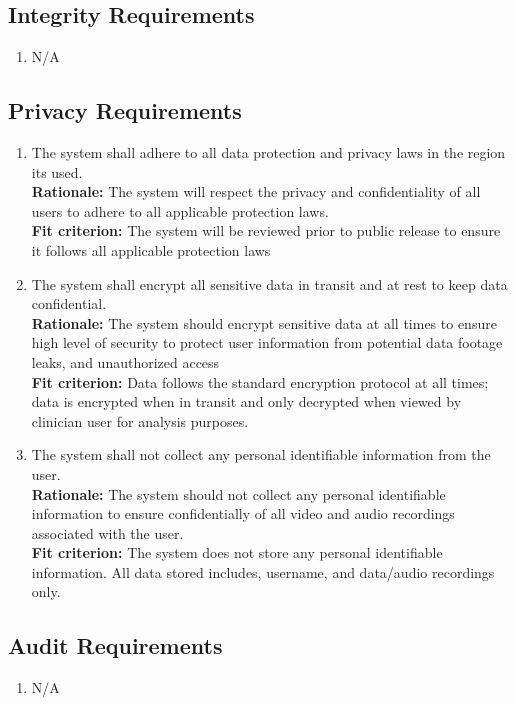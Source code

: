 \documentclass[12pt]{article}
\begin{document}
\subsection{Integrity Requirements}
\begin{enumerate}[{SR-INT}1. ]
  \item N/A
\end{enumerate}
\subsection{Privacy Requirements}
\begin{enumerate}[{SR-P}1. ]
  \item The system shall adhere to all data protection and privacy laws in the region its used.\\
  \textbf{Rationale: }The system will respect the privacy and confidentiality of all users to adhere to all applicable protection laws.\\
  \textbf{Fit criterion: }The system will be reviewed prior to public release to ensure it follows all applicable protection laws
  \item The system shall encrypt all sensitive data in transit and at rest to keep data confidential.\\
  \textbf{Rationale: }The system should encrypt sensitive data at all times to ensure high level of security to protect user information from potential data footage leaks, and unauthorized access \\
  \textbf{Fit criterion: }Data follows the standard encryption protocol at all times; data is encrypted when in transit and only decrypted when viewed by clinician user for analysis purposes.
  \item The system shall not collect any personal identifiable information from the user.\\
  \textbf{Rationale: }The system should not collect any personal identifiable information to ensure confidentially of all video and audio recordings associated with the user. \\
  \textbf{Fit criterion: }The system does not store any personal identifiable information. All data stored includes, username, and data/audio recordings only. 
\end{enumerate}
\subsection{Audit Requirements}
\begin{enumerate}[{SR-AU}1. ]
  \item N/A
\end{enumerate}
\end{document}
